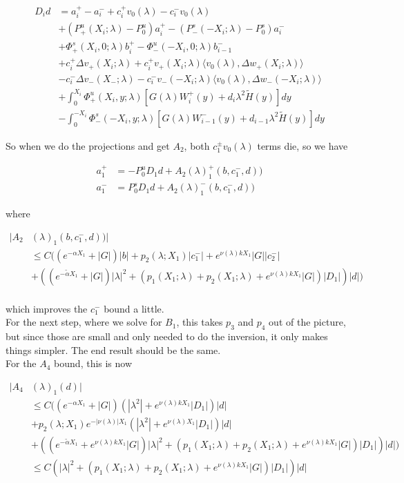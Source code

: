 \documentclass[12pt]{article}
\begin{document}
\begin{enumerate}
\begin{align*}
D_i d &= a_i^+ - a_i^- + c_i^+ v_0(\lambda) - c_i^- v_0(\lambda) \\
&+ (P^u_+(X_i; \lambda) - P_0^u)a_i^+ - (P^s_-(-X_i; \lambda) - P_0^s)a_i^- \\
&+ \Phi^s_+(X_i, 0; \lambda)b_i^+ - \Phi^u_-(-X_i, 0; \lambda)b_{i-1}^- \\
&+ c_i^+ \Delta v_+(X_i; \lambda) + c_i^+ v_+(X_i; \lambda) \langle v_0(\lambda), \Delta w_+(X_i; \lambda) \rangle \\
&- c_i^- \Delta v_-(X_-; \lambda) - c_i^- v_-(-X_i; \lambda) \langle v_0(\lambda), \Delta w_-(-X_i; \lambda) \rangle \\
&+ \int_0^{X_i} \Phi^u_+(X_i, y; \lambda) [ G(\lambda)W_i^+(y) + d_i \lambda^2 \tilde{H}(y) ] dy \\
&- \int_0^{-X_i} \Phi^s_-(-X_i, y; \lambda) [ G(\lambda)W_{i-1}^-(y) + d_{i-1} \lambda^2 \tilde{H}(y) ] dy
\end{align*}

So when we do the projections and get $A_2$, both $c_1^\pm v_0(\lambda)$ terms die, so we have

\begin{align*}
a_1^+ &= -P^u_0 D_1 d + A_2(\lambda)_1^+(b, c_1^-, d))\\
a_1^- &=  P^s_0 D_1 d + A_2(\lambda)_1^-(b, c_1^-, d))
\end{align*}

where

\begin{align*}
|A_2&(\lambda)_1(b, c_1^-, d))| \\
&\leq C( (e^{-\alpha X_1} + |G|) |b| + p_2(\lambda; X_1) |c_1^-| + e^{\nu(\lambda)k X_1} |G||c_2^-| \\
&+ ((e^{-\tilde{\alpha} X_1} + |G|) |\lambda|^2 + (p_1(X_1; \lambda) + p_2(X_1; \lambda) + e^{\nu(\lambda)k X_1} |G|)|D_1|)|d| ) \\
\end{align*}

which improves the $c_1^-$ bound a little.\\

For the next step, where we solve for $B_1$, this takes $p_3$ and $p_4$ out of the picture, but since those are small and only needed to do the inversion, it only makes things simpler. The end result should be the same.\\

For the $A_4$ bound, this is now

\begin{align*}
|A_4&(\lambda)_1(d)| \\
&\leq C( (e^{-\alpha X_1} + |G|) (|\lambda^2| + e^{\nu(\lambda)k X_1}|D_1|)|d| \\ 
&+ p_2(\lambda; X_1) e^{-|\nu(\lambda)| X_1} (|\lambda^2| + e^{\nu(\lambda)X_1}|D_1|)|d| \\
&+ ((e^{-\tilde{\alpha} X_1} + e^{\nu(\lambda)k X_1} |G|) |\lambda|^2 + (p_1(X_1; \lambda) + p_2(X_1; \lambda) + e^{\nu(\lambda) k X_1} |G|)|D_1|)|d| )\\
&\leq C(|\lambda|^2 + (p_1(X_1; \lambda) + p_2(X_1; \lambda) + e^{\nu(\lambda) k X_1} |G|)|D_1|) |d|
\end{align*}


\end{enumerate}
\end{document}
